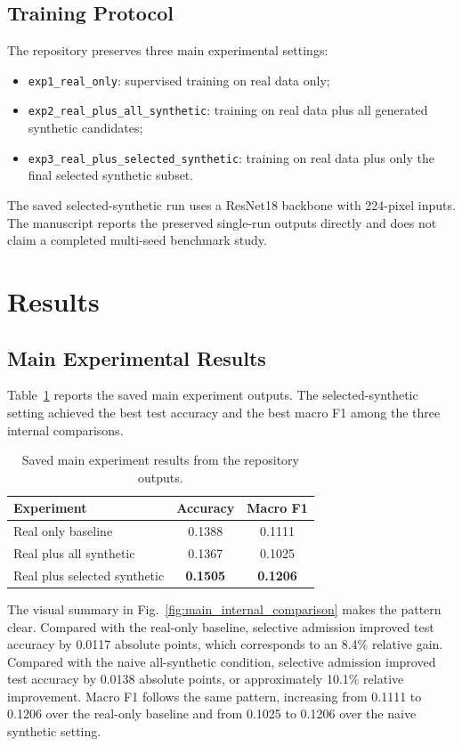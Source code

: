 \documentclass[conference]{IEEEtran}
\begin{document}
\subsection{Training Protocol}
The repository preserves three main experimental settings:
\begin{itemize}
    \item \texttt{exp1\_real\_only}: supervised training on real data only;
    \item \texttt{exp2\_real\_plus\_all\_synthetic}: training on real data plus all generated synthetic candidates;
    \item \texttt{exp3\_real\_plus\_selected\_synthetic}: training on real data plus only the final selected synthetic subset.
\end{itemize}

The saved selected-synthetic run uses a ResNet18 backbone with 224-pixel inputs. The manuscript reports the preserved single-run outputs directly and does not claim a completed multi-seed benchmark study.

\section{Results}
\subsection{Main Experimental Results}
Table~\ref{tab:main_results} reports the saved main experiment outputs. The selected-synthetic setting achieved the best test accuracy and the best macro F1 among the three internal comparisons.

\begin{table}[t]
\caption{Saved main experiment results from the repository outputs.}
\label{tab:main_results}
\centering
\begin{tabular}{lcc}
\toprule
\textbf{Experiment} & \textbf{Accuracy} & \textbf{Macro F1} \\
\midrule
Real only baseline & 0.1388 & 0.1111 \\
Real plus all synthetic & 0.1367 & 0.1025 \\
Real plus selected synthetic & \textbf{0.1505} & \textbf{0.1206} \\
\bottomrule
\end{tabular}
\end{table}

The visual summary in Fig.~\ref{fig:main_internal_comparison} makes the pattern clear. Compared with the real-only baseline, selective admission improved test accuracy by 0.0117 absolute points, which corresponds to an 8.4\% relative gain. Compared with the naive all-synthetic condition, selective admission improved test accuracy by 0.0138 absolute points, or approximately 10.1\% relative improvement. Macro F1 follows the same pattern, increasing from 0.1111 to 0.1206 over the real-only baseline and from 0.1025 to 0.1206 over the naive synthetic setting.
\end{document}
